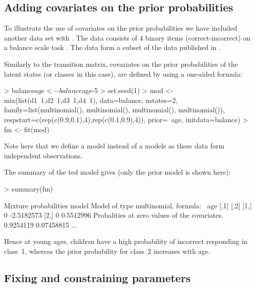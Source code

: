 \documentclass[article]{jss}
\begin{document}
\subsection{Adding covariates on the prior probabilities}

To illustrate the use of covariates on the prior probabilities we have included
another data set with . The  data consists 
of 4 binary items (correct-incorrect) on a balance scale task 
\citet{Siegler1981}. The data form a subset of the data published in 
\citet{Jansen2002}. 

Similarly to the transition matrix, covariates on the prior 
probabilities of the latent states (or classes in this case), are 
defined by using a one-sided formula: 
\begin{CodeChunk}
\begin{CodeInput}
> balance$age <- balance$age-5
> set.seed(1)
> mod <- mix(list(d1~1,d2~1,d3~1,d4~1), data=balance, nstates=2,
    family=list(multinomial(), multinomial(), multinomial(),
    multinomial()), respstart=c(rep(c(0.9,0.1),4),rep(c(0.1,0.9),4)), 
    prior=~age, initdata=balance)
> fm <- fit(mod)
\end{CodeInput}
\end{CodeChunk}
Note here that we define a  model instead of a 
models as these data form independent observations.

The summary of the ted model gives (only the prior model is 
shown here): 
\begin{CodeChunk}
\begin{CodeInput}
> summary(fm)
\end{CodeInput}
\begin{CodeOutput}
Mixture probabilities model 
Model of type multinomial, formula: ~age
   [,1]   [,2]
[1,]    0 -2.5182573
[2,]    0  0.5512996
Probalities at zero values of the covariates.
0.9254119 0.07458815 
...
\end{CodeOutput}
\end{CodeChunk}	
Hence at young ages, children have a high probability of incorrect 
responding in class~1, whereas the prior probability for class~2 
increases with age. 


\subsection{Fixing and constraining parameters}
\end{document}

